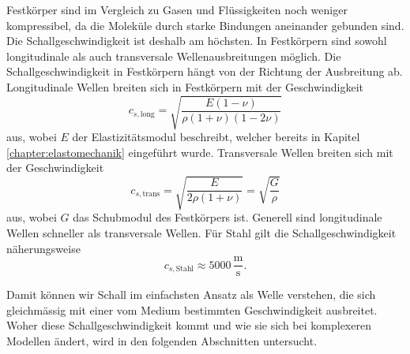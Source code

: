 Festkörper sind im Vergleich zu Gasen und Flüssigkeiten noch weniger
kompressibel, da die Moleküle durch starke Bindungen aneinander gebunden sind.
Die Schallgeschwindigkeit ist deshalb am höchsten.
In Festkörpern sind sowohl longitudinale als auch transversale
Wellenausbreitungen möglich.
Die Schallgeschwindigkeit in Festkörpern hängt von der Richtung der
Ausbreitung ab.
Longitudinale Wellen breiten sich in Festkörpern mit der Geschwindigkeit
\begin{equation}
    c_{s,\text{long}} = \sqrt{\frac{E(1-\nu)}{\rho(1+\nu)(1-2\nu)}}
\end{equation}
aus, wobei $E$ der Elastizitätsmodul beschreibt, welcher bereits in
Kapitel \ref{chapter:elastomechanik} eingeführt wurde.
Transversale Wellen breiten sich mit der Geschwindigkeit
\begin{equation}
    c_{s,\text{trans}} = \sqrt{\frac{E}{2\rho(1+\nu)}} = \sqrt{\frac{G}{\rho}}
\end{equation}
aus, wobei $G$ das Schubmodul des Festkörpers ist.
Generell sind longitudinale Wellen schneller als transversale Wellen.
Für Stahl gilt die Schallgeschwindigkeit näherungsweise
\begin{equation}
    c_{s,\text{Stahl}} \approx 5000 \,\frac{\mathrm{m}}{\mathrm{s}}.
\end{equation}

Damit können wir Schall im einfachsten Ansatz als Welle verstehen, die
sich gleichmässig mit einer vom Medium bestimmten Geschwindigkeit ausbreitet.
Woher diese Schallgeschwindigkeit kommt und wie sie sich bei
komplexeren Modellen ändert, wird in den folgenden Abschnitten untersucht.